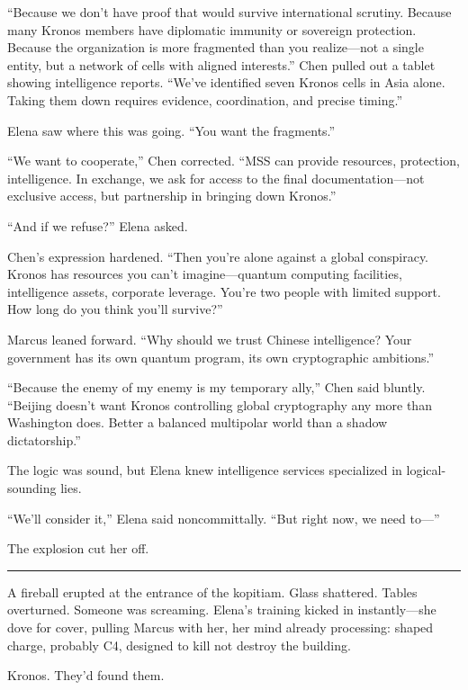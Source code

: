 \documentclass[12pt,letterpaper]{book}
\begin{document}
``Because we don't have proof that would survive international scrutiny. Because many Kronos members have diplomatic immunity or sovereign protection. Because the organization is more fragmented than you realize---not a single entity, but a network of cells with aligned interests.'' Chen pulled out a tablet showing intelligence reports. ``We've identified seven Kronos cells in Asia alone. Taking them down requires evidence, coordination, and precise timing.''

Elena saw where this was going. ``You want the fragments.''

``We want to cooperate,'' Chen corrected. ``MSS can provide resources, protection, intelligence. In exchange, we ask for access to the final documentation---not exclusive access, but partnership in bringing down Kronos.''

``And if we refuse?'' Elena asked.

Chen's expression hardened. ``Then you're alone against a global conspiracy. Kronos has resources you can't imagine---quantum computing facilities, intelligence assets, corporate leverage. You're two people with limited support. How long do you think you'll survive?''

Marcus leaned forward. ``Why should we trust Chinese intelligence? Your government has its own quantum program, its own cryptographic ambitions.''

``Because the enemy of my enemy is my temporary ally,'' Chen said bluntly. ``Beijing doesn't want Kronos controlling global cryptography any more than Washington does. Better a balanced multipolar world than a shadow dictatorship.''

The logic was sound, but Elena knew intelligence services specialized in logical-sounding lies.

``We'll consider it,'' Elena said noncommittally. ``But right now, we need to---''

The explosion cut her off.

\begin{center}\rule{0.5\linewidth}{0.5pt}\end{center}

A fireball erupted at the entrance of the kopitiam. Glass shattered. Tables overturned. Someone was screaming. Elena's training kicked in instantly---she dove for cover, pulling Marcus with her, her mind already processing: shaped charge, probably C4, designed to kill not destroy the building.

Kronos. They'd found them.
\end{document}
